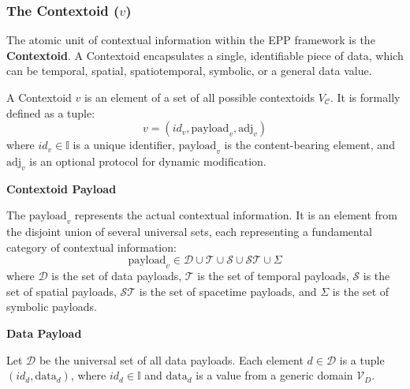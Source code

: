 \subsubsection[The Contextoid (v)]{The Contextoid (\(v\))}
\label{ssec:contextoid_formal_revised}

The atomic unit of contextual information within the EPP framework is the \textbf{Contextoid}. A Contextoid encapsulates a single, identifiable piece of data, which can be temporal, spatial, spatiotemporal, symbolic, or a general data value.

\begin{definition}[Contextoid]
\label{def:contextoid}
A Contextoid \( v \) is an element of a set of all possible contextoids \( V_{\mathcal{C}} \). It is formally defined as a tuple:
\[ v = (id_v, \text{payload}_v, \text{adj}_v) \]
where \( id_v \in \mathbb{I} \) is a unique identifier, \( \text{payload}_v \) is the content-bearing element, and \( \text{adj}_v \) is an optional protocol for dynamic modification.
\end{definition}


\textbf{Contextoid Payload}\newline 

\begin{definition}
\label{def:contextoid_paylod}
The \( \text{payload}_v \) represents the actual contextual information. It is an element from the disjoint union of several universal sets, each representing a fundamental category of contextual information:
\[ \text{payload}_v \in \mathcal{D} \cup \mathcal{T} \cup \mathcal{S} \cup \mathcal{ST} \cup \Sigma \]
where \(\mathcal{D}\) is the set of data payloads, \(\mathcal{T}\) is the set of temporal payloads, \(\mathcal{S}\) is the set of spatial payloads, \(\mathcal{ST}\) is the set of spacetime payloads, and \(\Sigma\) is the set of symbolic payloads.
\end{definition}

\textbf{Data Payload}\newline 

\begin{definition}
\label{def:contextoid_paylod_data}
Let \(\mathcal{D}\) be the universal set of all data payloads. Each element \(d \in \mathcal{D}\) is a tuple \( (id_d, \text{data}_d) \), where \(id_d \in \mathbb{I}\) and \(\text{data}_d\) is a value from a generic domain \(\mathcal{V}_D\).
\end{definition}

